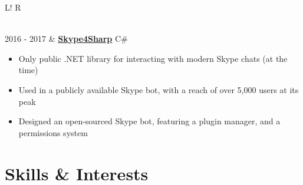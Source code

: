 \documentclass[10pt, a4paper]{article}
\newcommand\vsep{\color{lightgray} \vrule width 0.5pt}
\newcommand\sect[1]{\section*{\hspace{.05cm} \Large\sc #1}}
\newcommand\itemizespace{\vspace{-0.65\baselineskip}}
\newcommand\tspace{\hfill}
\begin{document}
\begin{tabular}{L!{\vsep}R}
\begin{itemize}[label=\raisebox{0.25ex}{\tiny$\bullet$}]
                        \itemizespace
                    \end{itemize} \\
                2016 - 2017 & \href{https://github.com/lin-e/Skype4Sharp}{\textbf{Skype4Sharp}} \tspace C\#
                    \begin{itemize}[label=\raisebox{0.25ex}{\tiny$\bullet$}]
                        \setlength{\itemindent}{-0.125in}
                        \item Only public .NET library for interacting with modern Skype chats (at the time)
                        \item Used in a publicly available Skype bot, with a reach of over 5,000 users at its peak
                        \item Designed an open-sourced Skype bot, featuring a plugin manager, and a permissions system
                        \vspace{-1.1\baselineskip}
                    \end{itemize}
            \end{tabular}
        \sect{Skills \& Interests}
\end{document}
